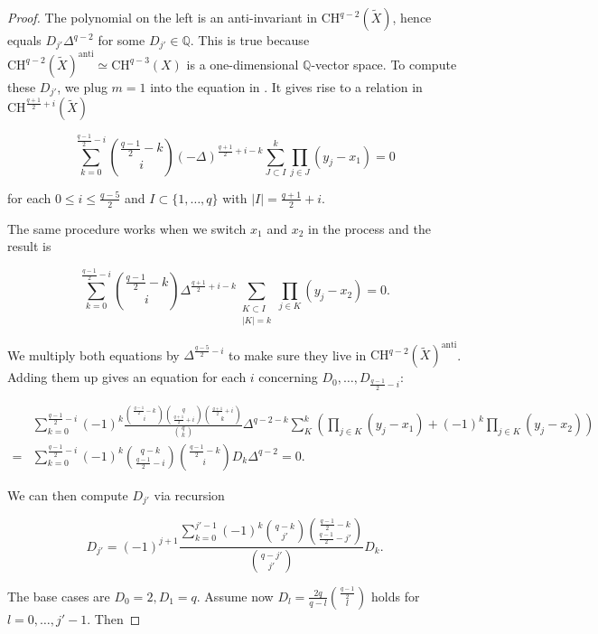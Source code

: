 \documentclass[11pt]{article}
\begin{document}
\begin{proof}

    The polynomial on the left is an anti-invariant in \(\mathrm{CH}^{q-2}(\tilde{X})\), hence equals \(D_{j'}\Delta^{q-2}\) for some \(D_{j'}\in \mathbb{Q}\). This is true because \(\mathrm{CH}^{q-2}(\tilde{X})^{\text{anti}}\simeq \mathrm{CH}^{q-3}(X)\) is a one-dimensional \(\mathbb{Q}\)-vector space. 
    To compute these \(D_{j'}\), we plug \(m=1\) into the equation in . It gives rise to a relation in \(\mathrm{CH}^{\frac{q+1}{2} + i}(\tilde{X})\)

    \[
    \sum_{k = 0}^{\frac{q-1}{2}-i}\binom{\frac{q-1}{2}-k}{i}(-\Delta)^{\frac{q+1}{2}+i - k}\sum_{J\subset I}^k\prod_{j\in J}(y_j - x_1) = 0
    \]

    for each \(0\leq i\leq \frac{q-5}{2}\) and \(I\subset \{1, \dots, q\}\) with \(|I| = \frac{q+1}{2} + i\).

    The same procedure works when we switch \(x_1\) and \(x_2\) in the process and the result is 

    \[
    \sum_{k = 0}^{\frac{q-1}{2}-i}\binom{\frac{q-1}{2}-k}{i}\Delta^{\frac{q+1}{2}+i - k}\sum_{\substack{K\subset I \\ |K| = k}}\prod_{j\in K}(y_j - x_2) = 0.
    \]

    We multiply both equations by \(\Delta^{\frac{q-5}{2}-i}\) to make sure they live in \(\mathrm{CH}^{q-2}(\tilde{X})^{\text{anti}}\). Adding them up gives an equation for each \(i\) concerning \(D_0, \dots, D_{\frac{q-1}{2}-i}\):

    \begin{align*}
        &\sum_{k = 0}^{\frac{q-1}{2}-i}(-1)^k\frac{\binom{\frac{q-1}{2}-k}{i}\binom{q}{\frac{q+1}{2}+i}\binom{\frac{q+1}{2}+i}{k}}{\binom{q}{k}}\Delta^{q-2-k}\sum_{K}^{k}\left(\prod_{j\in K}(y_j - x_1) + (-1)^k\prod_{j\in K}(y_j - x_2)\right)\\ 
        =&\sum_{k = 0}^{\frac{q-1}{2}-i}(-1)^k\binom{q-k}{\frac{q-1}{2}-i}\binom{\frac{q-1}{2}-k}{i}D_k\Delta^{q-2} = 0.
    \end{align*}

    We can then compute \(D_{j'}\) via recursion

    \[
    D_{j'} = (-1)^{j+1}\frac{\sum\limits_{k = 0}^{j' - 1}(-1)^k\binom{q-k}{j'}\binom{\frac{q-1}{2}-k}{\frac{q-1}{2}-j'}}{\binom{q-j'}{j'}}D_k.
    \]

    The base cases are \(D_0 = 2, D_1 = q\). Assume now \(D_{l} = \frac{2q}{q-l}\binom{\frac{q-1}{2}}{l}\) holds for \(l = 0, \dots, j'-1\). Then 


\end{proof}
\end{document}
